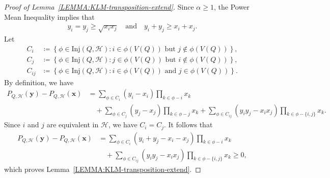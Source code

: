 \documentclass[11pt,a4paper]{article}
\begin{document}
\begin{proof}[Proof of Lemma~\ref{LEMMA:KLM-transposition-extend}]
    Since $\alpha \ge 1$, the Power Mean Inequality implies that 
    \begin{align*}
        y_i = y_j \ge \sqrt{x_i x_j}
        \quad\text{and}\quad 
        y_i + y_j \ge x_i + x_j. 
    \end{align*}
    Let 
    \begin{align*}
        C_{i}
        & \coloneqq \left\{\phi \in \mathrm{Inj}(Q,\mathcal{H}) \colon \text{$i \in \phi(V(Q))$ but $j \not\in \phi(V(Q))$} \right\}, \\[0.3em]
        C_{j}
        & \coloneqq \left\{\phi \in \mathrm{Inj}(Q,\mathcal{H}) \colon \text{$j \in \phi(V(Q))$ but $i \not\in \phi(V(Q))$} \right\}, \\[0.3em]
        C_{ij}
        & \coloneqq \left\{\phi \in \mathrm{Inj}(Q,\mathcal{H}) \colon \text{$i \in \phi(V(Q))$ and $j \in \phi(V(Q))$} \right\}.
    \end{align*}
    By definition, we have 
    \begin{align*}
        P_{Q,\mathcal{H}}(\mathbf{y}) - P_{Q,\mathcal{H}}(\mathbf{x})
        & = \sum_{\phi \in C_i} \left(y_i - x_i\right) \prod_{k \in \phi - i} x_k \\
        & \quad  +  \sum_{\phi \in C_j} \left(y_j - x_j\right) \prod_{k \in \phi - j} x_k 
          +  \sum_{\phi \in C_{ij}} \left(y_iy_j - x_ix_j\right) \prod_{k \in \phi - \{i,j\}} x_k. 
    \end{align*}
    Since $i$ and $j$ are equivalent in $\mathcal{H}$, we have $C_i = C_j$. 
    It follows that 
    \begin{align*}
        P_{Q,\mathcal{H}}(\mathbf{y}) - P_{Q,\mathcal{H}}(\mathbf{x})
        & = \sum_{\phi \in C_i} \left(y_i + y_j - x_i - x_j\right) \prod_{k \in \phi - i} x_k \\
        & \quad  +  \sum_{\phi \in C_{ij}} \left(y_iy_j - x_ix_j\right) \prod_{k \in \phi - \{i,j\}} x_k
        \ge 0,
    \end{align*}
    which proves Lemma~\ref{LEMMA:KLM-transposition-extend}. 
\end{proof}
\end{document}
